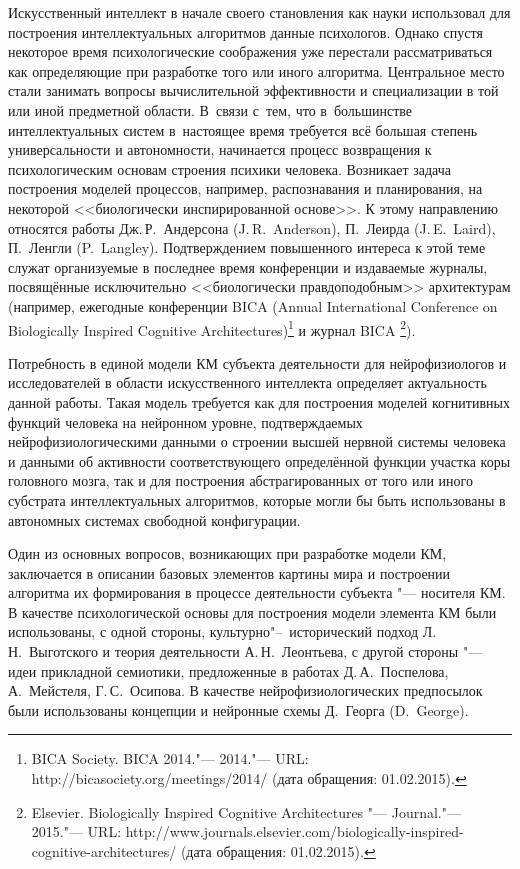 Искусственный интеллект в начале своего становления как науки использовал для построения интеллектуальных алгоритмов данные психологов. Однако спустя некоторое время психологические соображения уже перестали рассматриваться как определяющие при разработке того или иного алгоритма. Центральное место стали занимать вопросы вычислительной эффективности и специализации в той или иной предметной области. В~связи с~тем, что в~большинстве интеллектуальных систем в~настоящее время требуется всё большая степень универсальности и автономности, начинается процесс возвращения к психологическим основам строения психики человека. Возникает задача построения моделей процессов, например, распознавания и планирования, на некоторой <<биологически инспирированной основе>>. К этому направлению относятся работы Дж.\,Р.~Андерсона (J.\,R.~Anderson), П.~Леирда (J.\,E.~Laird), П.~Ленгли (P.~Langley). Подтверждением повышенного интереса к этой теме служат организуемые в последнее время конференции и издаваемые журналы, посвящённые исключительно <<биологически правдоподобным>> архитектурам (например, ежегодные конференции BICA (Annual International Conference on Biologically Inspired Cognitive Architectures)\footnote{BICA Society. BICA 2014."--- 2014."--- URL: http://bicasociety.org/meetings/2014/ (дата	обращения: 01.02.2015).} и журнал BICA \footnote{Elsevier. Biologically Inspired Cognitive Architectures "--- Journal."--- 2015."---
URL: http://www.journals.elsevier.com/biologically-inspired-cognitive-architectures/ (дата	обращения: 01.02.2015).}).

Потребность в единой модели КМ субъекта деятельности для нейрофизиологов и исследователей в области искусственного интеллекта определяет актуальность данной работы. Такая модель требуется как для построения моделей когнитивных функций человека на нейронном уровне, подтверждаемых нейрофизиологическими данными о строении высшей нервной системы человека и данными об активности соответствующего определённой функции участка коры головного мозга, так и для построения абстрагированных от того или иного субстрата интеллектуальных алгоритмов, которые могли бы быть использованы в автономных системах свободной конфигурации.

Один из основных вопросов, возникающих при разработке модели КМ, заключается в описании базовых элементов картины мира и построении алгоритма их формирования в процессе деятельности субъекта "--- носителя КМ. В качестве психологической основы для построения модели элемента КМ были использованы, с одной стороны, культурно"--~исторический подход Л.\,Н.~Выготского и теория деятельности А.\,Н.~Леонтьева, с другой стороны "--- идеи прикладной семиотики, предложенные в работах Д.\,А.~Поспелова, А.~Мейстеля, Г.\,С.~Осипова. В качестве нейрофизиологических предпосылок были использованы концепции и нейронные схемы Д.~Георга (D.~George).

